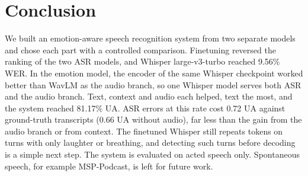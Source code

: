 \documentclass[conference]{IEEEtran}
\begin{document}
\section{Conclusion}

We built an emotion-aware speech recognition system from two separate models and chose each part with a controlled
comparison. Finetuning reversed the ranking of the two ASR models, and Whisper large-v3-turbo reached 9.56\% WER. In
the emotion model, the encoder of the same Whisper checkpoint worked better than WavLM as the audio branch, so one
Whisper model serves both ASR and the audio branch. Text, context and audio each helped, text the most, and the
system reached 81.17\% UA. ASR errors at this rate cost 0.72 UA against ground-truth transcripts (0.66 UA without
audio), far less than the gain from the audio branch or from context. The finetuned Whisper still repeats tokens on
turns with only laughter or breathing, and detecting such turns before decoding is a simple next step. The system is evaluated on acted speech only. Spontaneous speech, for example MSP-Podcast, is left for future
work.



\end{document}
